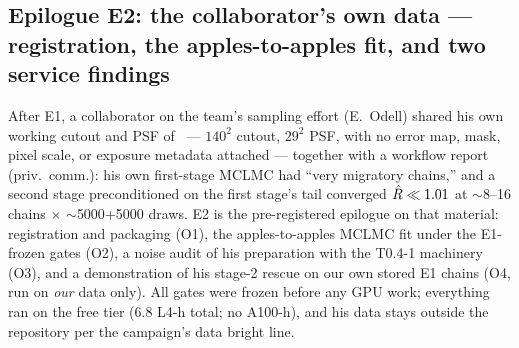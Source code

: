 \subsection{Epilogue E2: the collaborator's own data --- registration, the
apples-to-apples fit, and two service findings}
\label{sec:e2}

After E1, a collaborator on the team's sampling effort (E.~Odell) shared
his own working cutout and PSF of \foundry\ --- $140^2$ cutout, $29^2$
PSF, with no error map, mask, pixel scale, or exposure metadata attached
--- together with a workflow report (priv.\ comm.): his own first-stage
MCLMC had ``very migratory chains,'' and a second stage preconditioned on
the first stage's tail converged $\hat{R}\ll1.01$ at $\sim$8--16 chains
$\times$ $\sim$5000{+}5000 draws. E2 is the pre-registered epilogue on
that material: registration and packaging (O1), the apples-to-apples
MCLMC fit under the E1-frozen gates (O2), a noise audit of his
preparation with the T0.4-1 machinery (O3), and a demonstration of his
stage-2 rescue on our own stored E1 chains (O4, run on \emph{our} data
only). All gates were frozen before any GPU work; everything ran on the
free tier (6.8 L4-h total; no A100-h), and his data stays outside the
repository per the campaign's data bright line.

